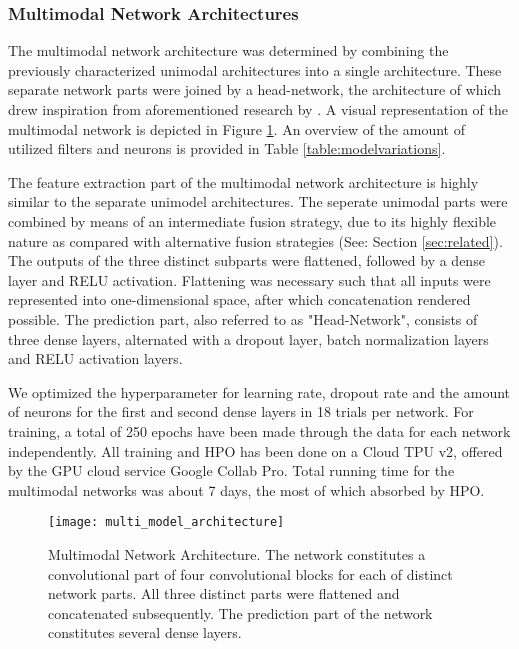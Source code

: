 \documentclass[fleqn,11pt]{paper}
\begin{document}
\subsubsection*{Multimodal Network Architectures} \label{section:multimodal}
The multimodal network architecture was determined by combining the previously characterized unimodal architectures into a single architecture. These separate network parts were joined by a head-network, the architecture of which drew inspiration from aforementioned research by . A visual representation of the multimodal network is depicted in Figure \ref{fig:multiarchitecture}. An overview of the amount of utilized filters and neurons is provided in Table \ref{table:modelvariations}.

The feature extraction part of the multimodal network architecture is highly similar to the separate unimodel architectures. The seperate unimodal parts were combined by means of an intermediate fusion strategy, due to its highly flexible nature as compared with alternative fusion strategies (See: Section \ref{sec:related}). The outputs of the three distinct subparts were flattened, followed by a dense layer and RELU activation.  Flattening was necessary such that all inputs were represented into one-dimensional space, after which concatenation rendered possible. The prediction part, also referred to as "Head-Network", consists of three dense layers, alternated with a dropout layer, batch normalization layers and RELU activation layers.  

We optimized the hyperparameter for learning rate, dropout rate and the amount of neurons for the first and second dense layers in 18 trials per network.  For training, a total of 250 epochs have been made through the data for each network independently. All training and HPO has been done on a Cloud TPU v2,  offered by the GPU cloud service Google Collab Pro.  Total running time for the multimodal networks was about 7 days, the most of which absorbed by HPO. 

\vspace{6mm}
\begin{figure}[h]
\centering
\texttt{[image: multi\_model\_architecture]}
\caption{Multimodal Network Architecture. The network constitutes a convolutional part of four convolutional blocks for each of distinct network parts. All three distinct parts were flattened and concatenated subsequently. The prediction part of the network constitutes several dense layers.}\label{fig:multiarchitecture}
\end{figure}
\end{document}
